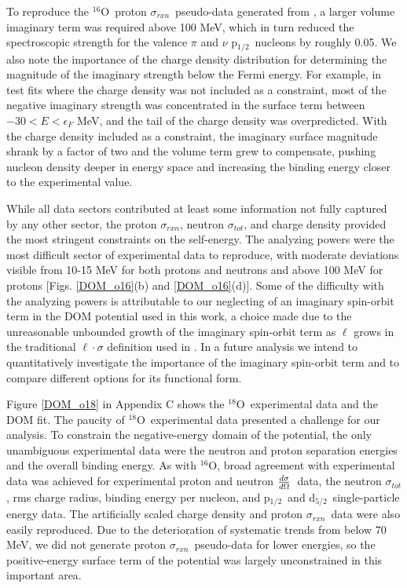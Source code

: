 \documentclass[twocolumn,secnumarabic,amssymb, nobibnotes, aps, prl,
superscriptaddress, nobalancelastpage, floatfix]{revtex4}
\newcommand{\tot}{\ensuremath{\sigma_{tot}}}
\newcommand{\rxn}{\ensuremath{\sigma_{rxn}}}
\newcommand{\el}{\ensuremath{\frac{\lowercase{d}\sigma}{\lowercase{d}\Omega}}}
\newcommand{\oSix}{\ensuremath{^{16}}O}
\newcommand{\oEight}{\ensuremath{^{18}}O}
\newcommand{\pOne}{p\ensuremath{_{1/2}}}
\newcommand{\dFive}{d\ensuremath{_{5/2}}}
\begin{document}
To reproduce the \oSix\ proton \rxn\
pseudo-data generated from \cite{Carlson1996}, a larger volume imaginary term
was required above 100 MeV, which in turn reduced the spectroscopic strength for
the valence $\pi$ and $\nu$ \pOne\ nucleons by roughly 0.05.
We also note the importance of the charge density distribution for determining the 
magnitude of the imaginary strength below the Fermi energy. For example, in test
fits where the charge density was not included as a constraint, most of the
negative imaginary strength was concentrated in the surface term
between $-30 < E < \epsilon_{F}$ MeV, and the tail of the charge density was
overpredicted. With the charge density included as a constraint,
the imaginary surface magnitude shrank by a factor of two and the volume term
grew to compensate, pushing nucleon density deeper in energy space and
increasing the binding energy closer to the experimental value.

While all data sectors contributed at least some information not fully
captured by any other sector, the proton \rxn, neutron \tot, and charge density
provided the most stringent constraints on the self-energy. The analyzing powers
were the most difficult sector of experimental data to
reproduce, with moderate deviations visible from 10-15 MeV for both protons and
neutrons and above 100 MeV for protons [Figs. \ref{DOM_o16}(b) and \ref{DOM_o16}(d)].
Some of the difficulty with the analyzing powers is attributable to our neglecting of
an imaginary spin-orbit term in the DOM potential used in this work, a choice
made due to the unreasonable unbounded growth of the imaginary spin-orbit term
as $\ell$ grows in the traditional $\ell\cdot\sigma$ definition used in
\cite{KoningDelaroche}. In a future analysis we intend to quantitatively
investigate the importance of the imaginary spin-orbit term and to compare
different options for its functional form.

Figure \ref{DOM_o18} in Appendix C shows the \oEight\
experimental data and the DOM fit.
The paucity of \oEight\ experimental data presented a challenge for our analysis.
To constrain the negative-energy domain
of the potential, the only unambiguous experimental data were the neutron
and proton separation energies and the overall binding energy.
As with \oSix, broad agreement with experimental data was achieved for
experimental proton and neutron \el\ data, the neutron \tot, rms charge radius,
binding energy per nucleon, and \pOne\ and \dFive\ single-particle energy data.
The artificially scaled charge density and proton \rxn\ data were also
easily reproduced. Due to the deterioration of systematic trends from
\cite{Carlson1996} below 70 MeV, we did not generate proton \rxn\ pseudo-data
for lower energies, so the positive-energy surface term of the potential
was largely unconstrained in this important area.
\end{document}
